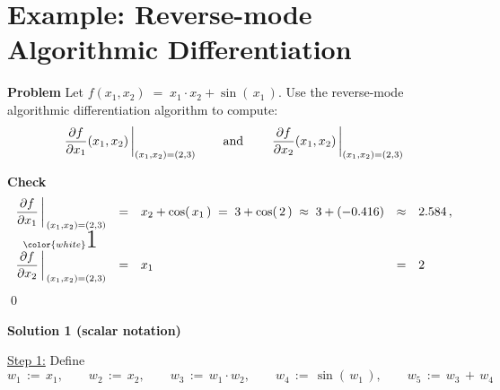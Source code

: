 

\section{Example: Reverse-mode Algorithmic Differentiation}
\setcounter{theorem}{0}
\setcounter{equation}{0}


\renewcommand{\theenumi}{\roman{enumi}}
\renewcommand{\labelenumi}{\textnormal{(\theenumi)}$\;\;$}


\noindent
\textbf{Problem}
\vskip 0.2cm
\noindent
Let
\;$f(x_{1},x_{2}) \; = \; x_{1} \cdot x_{2} + \sin(\,x_{1}\,)$.\;
Use the reverse-mode algorithmic differentiation algorithm to compute:
\begin{equation*}
\left.\dfrac{\partial f}{\partial x_{1}}(x_{1},x_{2})\,\right\vert_{(x_{1},x_{2}) = (2,3)}
\quad\quad
\textnormal{and}
\quad\quad
\left.\dfrac{\partial f}{\partial x_{2}}(x_{1},x_{2})\,\right\vert_{(x_{1},x_{2}) = (2,3)}
\end{equation*}

\vskip 0.5cm
\noindent
\textbf{Check}
\vskip 0.2cm
\begin{equation*}
\begin{array}{cclcl}
\left.\dfrac{\partial f}{\partial x_{1}}\,\right\vert_{\,(x_{1},x_{2})=(2,3)}
&=&
	x_{2} + \cos(\,x_{1}\,) \;=\; 3 + \cos(\,2\,) \;\approx\; 3 + (-0.416)
	& \approx &
		2.584\,,
\\
\overset{{\color{white}\textnormal{\huge1}}}{\left.\dfrac{\partial f}{\partial x_{2}}\,\right\vert_{\,(x_{1},x_{2})=(2,3)}}
&=&
	x_{1}
	&=&
		2
\end{array}
\end{equation*}
\qed

\vskip 0.5cm
\noindent
\textbf{Solution 1 (scalar notation)}

\vskip 0.5cm
\noindent
\underline{Step 1:}
\vskip 0.2cm
\noindent
Define
\begin{equation*}
w_{1} \, := \, x_{1},
\quad\quad
w_{2} \, := \, x_{2},
\quad\quad
w_{3} \, := \, w_{1} \cdot w_{2},
\quad\quad
w_{4} \, := \, \sin(\,w_{1}\,),
\quad\quad
w_{5} \, := \, w_{3} \, + \, w_{4}
\end{equation*}

